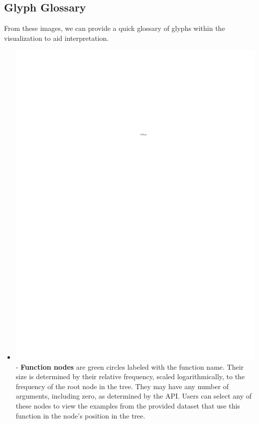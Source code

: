 \documentclass[conference]{IEEEtran}
\begin{document}
	\subsection{Glyph Glossary}
	
	From these images, we can provide a quick glossary of glyphs within the
	visualization to aid interpretation. \begin{itemize} \item
		\includegraphics{glossary-green} - \textbf{Function nodes} are green circles
		labeled with the function name. Their size is determined by their relative
		frequency, scaled logarithmically, to the frequency of the root node in the
		tree. They may have any number of arguments, including zero, as determined by
		the API. Users can select any of these nodes to view the examples from the
		provided dataset that use this function in the node's position in the tree.
		

\end{itemize}
\end{document}

